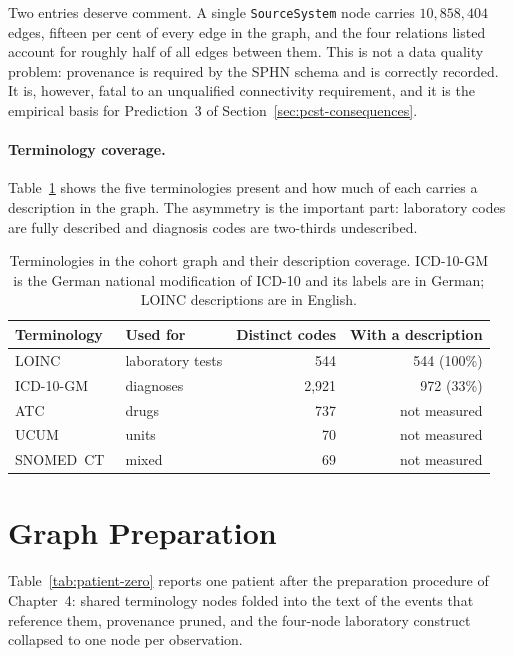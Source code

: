 Two entries deserve comment. A single \texttt{SourceSystem} node carries
$10{,}858{,}404$ edges, fifteen per cent of every edge in the graph, and the four
relations listed account for roughly half of all edges between them. This is not
a data quality problem: provenance is required by the SPHN schema and is
correctly recorded. It is, however, fatal to an unqualified connectivity
requirement, and it is the empirical basis for Prediction~3 of
Section~\ref{sec:pcst-consequences}.

\paragraph{Terminology coverage.} Table~\ref{tab:terminology-coverage} shows the
five terminologies present and how much of each carries a description in the
graph. The asymmetry is the important part: laboratory codes are fully described
and diagnosis codes are two-thirds undescribed.

\begin{table}[t]
\centering
\caption{Terminologies in the cohort graph and their description coverage.
ICD-10-GM is the German national modification of ICD-10 and its labels are in
German; LOINC descriptions are in English.}
\label{tab:terminology-coverage}
\begin{tabular}{llrr}
\toprule
Terminology & Used for & Distinct codes & With a description \\
\midrule
LOINC~\cite{loinc} & laboratory tests & 544 & 544 (100\%) \\
ICD-10-GM~\cite{icd10} & diagnoses & 2{,}921 & 972 (33\%) \\
ATC~\cite{atc} & drugs & 737 & not measured \\
UCUM & units & 70 & not measured \\
SNOMED~CT~\cite{snomedct} & mixed & 69 & not measured \\
\bottomrule
\end{tabular}
\end{table}

\section{Graph Preparation} \label{sec:results-preparation}

Table~\ref{tab:patient-zero} reports one patient after the preparation procedure
of Chapter~4: shared terminology nodes folded into the text of the events that
reference them, provenance pruned, and the four-node laboratory construct
collapsed to one node per observation.

